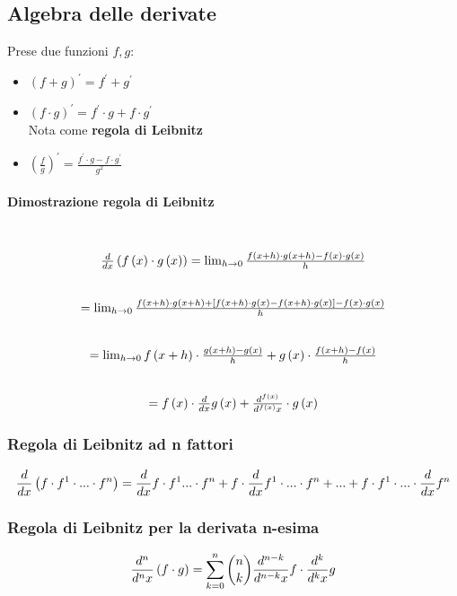 \documentclass{report}
\newcommand{\subsubsubsection}[1]{\paragraph{#1}\mbox{}\\}
\begin{document}
    \subsection{Algebra delle derivate}
        Prese due funzioni $f, g$:
        \begin{itemize}
            \item $\left(f + g\right)^{'} = f^{'} + g^{'}$
            \item $\left(f \cdot g\right)^{'} = f^{'} \cdot g + f \cdot g^{'}$\\
                Nota come \textbf{regola di Leibnitz}
            \item $\left(\frac{f}{g}\right)^{'} = \frac{f^{'} \cdot g - f \cdot g^{'}}{g^2}$
        \end{itemize}
        \subsubsubsection{Dimostrazione regola di Leibnitz}
            $$\begin{array}{c}
                \D{x}\left(f\left(x\right) \cdot g\left(x\right)\right) = \lim_{h \to 0}\frac{f\left(x + h\right) \cdot g\left(x + h\right) - f\left(x\right) \cdot g\left(x\right)}{h} \\ \\ \\
                = \lim_{h \to 0}\frac{f\left(x + h\right) \cdot g\left(x + h\right) +\left[f\left(x + h\right) \cdot g\left(x\right) - f\left(x + h\right) \cdot g\left(x\right)\right]  - f\left(x\right) \cdot g\left(x\right)}{h} \\ \\ \\
                = \lim_{h \to 0}f\left(x + h\right) \cdot \frac{g\left(x + h\right) - g\left(x\right)}{h} + g\left(x\right) \cdot \frac{f\left(x + h\right) - f\left(x\right)}{h} \\ \\ \\
                = f\left(x\right) \cdot \D{x}g\left(x\right) + \D{x}{f\left(x\right)} \cdot g\left(x\right)
            \end{array}$$
        \subsubsection{Regola di Leibnitz ad n fattori}
            $$\D{x}\left(f \cdot f^1 \cdot ... \cdot f^n\right) = 
                \D{x}f \cdot f^1 ... \cdot f^n + f \cdot \D{x}f^1 \cdot ... \cdot f^n + ... + f \cdot f^1 \cdot ... \cdot \D{x}f^n
            $$
        \subsubsection{Regola di Leibnitz per la derivata n-esima}
            $$\D{x}{n}\left(f \cdot g\right) = \sum_{k = 0}^n \binom{n}{k}\D{x}{n-k}f \cdot \D{x}{k}g$$
\end{document}
